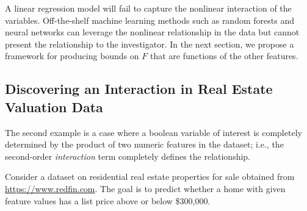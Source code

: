 \documentclass[ijds,nonblindrev]{informs-ijds}
\begin{document}



A linear regression model will fail to capture the nonlinear interaction of the variables.  Off-the-shelf machine learning methods such as random forests and neural networks can leverage the nonlinear relationship in the data but cannot present the relationship to the investigator.   In the next section, we propose a framework for producing bounds on $F$ that are functions of the other features.

\subsection{Discovering an Interaction in Real Estate Valuation Data}
\label{realestate}
The second example is a case where a boolean variable of interest is completely determined by the product of two numeric features in the dataset; i.e., the second-order \textit{interaction} term completely defines the relationship. %

Consider a dataset on residential real estate properties for sale obtained from \url{https://www.redfin.com}.  The goal is to predict whether a home with given feature values has a list price above or below \$300,000.  
\end{document}
